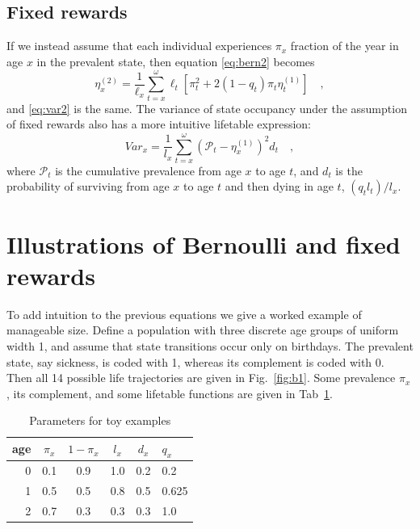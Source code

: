 \documentclass{bmcart}
\begin{document}
\subsection{Fixed rewards}
If we instead assume that each individual experiences $\pi_x$ fraction of the year in age $x$ in the prevalent state, then equation \eqref{eq:bern2} becomes
\begin{equation}
\eta^{(2)}_x = \frac{1}{\ell_x} \sum_{t=x}^\omega \ell_t\left[\pi_t^2 + 2(1-q_t)\pi_t\eta^{(1)}_t\right] \quad \mathrm{,}
\end{equation}
and \eqref{eq:var2} is the same. The variance of state occupancy under the assumption of fixed rewards also has a more intuitive lifetable expression:
\begin{equation}
\label{eq:varfixed2}
Var_x = \frac{1}{l_x}\sum_{t=x}^\omega (\mathcal{P}_t - \eta^{(1)}_x)^2 d_t \quad\mathrm{,}
\end{equation}
where $\mathcal{P}_t$ is the cumulative prevalence from age $x$ to age $t$, and $d_t$ is the probability of surviving from age $x$ to age $t$ and then dying in age $t$, $(q_t l_t)/l_x$. 

\section{Illustrations of Bernoulli and fixed rewards}
To add intuition to the previous equations we give a worked example of manageable size. Define a population with three discrete age groups of uniform width 1, and assume that state transitions occur only on birthdays. The prevalent state, say sickness, is coded with 1, whereas its complement is coded with 0. Then all 14 possible life trajectories are given in Fig.~\ref{fig:b1}. Some prevalence $\pi_x$, its complement, and some lifetable functions are given in Tab~\ref{tab:toy}.

\begin{table}[ht!]
\begin{tabular}{r|ccccl}
age & $\pi_x$ & $1-\pi_x$ & $l_x$ & $d_x$ & $q_x$\\
\hline
0 & 0.1 & 0.9 & 1.0 & 0.2 & 0.2   \\
1 & 0.5 & 0.5 & 0.8 & 0.5 & 0.625 \\
2 & 0.7 & 0.3 & 0.3 & 0.3 & 1.0  
\end{tabular}
\caption{Parameters for toy examples}
\label{tab:toy}
\end{table}
\end{document}
